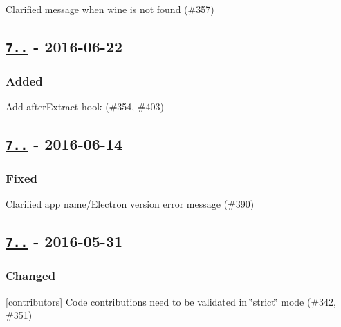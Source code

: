\begin{DoxyItemize}
\item Clarified message when {\ttfamily wine} is not found (\#357)
\end{DoxyItemize}

\subsection*{\href{https://github.com/electron-userland/electron-packager/compare/v7.0.4...v7.1.0}{\tt 7..} -\/ 2016-\/06-\/22}

\subsubsection*{Added}


\begin{DoxyItemize}
\item Add {\ttfamily after\+Extract} hook (\#354, \#403)
\end{DoxyItemize}

\subsection*{\href{https://github.com/electron-userland/electron-packager/compare/v7.0.3...v7.0.4}{\tt 7..} -\/ 2016-\/06-\/14}

\subsubsection*{Fixed}


\begin{DoxyItemize}
\item Clarified app name/\+Electron version error message (\#390)
\end{DoxyItemize}

\subsection*{\href{https://github.com/electron-userland/electron-packager/compare/v7.0.2...v7.0.3}{\tt 7..} -\/ 2016-\/05-\/31}

\subsubsection*{Changed}


\begin{DoxyItemize}
\item \mbox{[}contributors\mbox{]} Code contributions need to be validated in \char`\"{}strict\char`\"{} mode (\#342, \#351)
\end{DoxyItemize}

